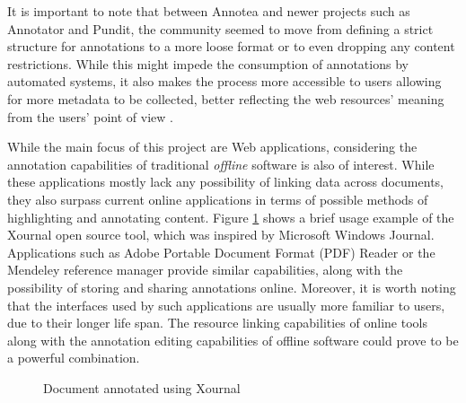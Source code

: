It is important to note that between Annotea and newer projects such as
Annotator and Pundit, the community seemed to move from defining a strict
structure for annotations to a more loose format or to even dropping any
content restrictions. While this might impede the consumption of annotations by
automated systems, it also makes the process more accessible to users allowing
for more metadata to be collected, better reflecting the web resources' meaning
from the users' point of view \cite{ref:wu}.

While the main focus of this project are Web applications, considering the
annotation capabilities of traditional \textit{offline} software is also of
interest. While these applications mostly lack any possibility of linking data
across documents, they also surpass current online applications in terms of
possible methods of highlighting and annotating content. Figure
\ref{fig:xournal} shows a brief usage example of the Xournal open source tool,
which was inspired by Microsoft Windows Journal. Applications such as Adobe
Portable Document Format (PDF) Reader \cite{ref:adobe} or the Mendeley
\cite{ref:mendeley} reference manager provide similar capabilities, along with
the possibility of storing and sharing annotations online. Moreover, it is
worth noting that the interfaces used by such applications are usually more
familiar to users, due to their longer life span. The resource linking
capabilities of online tools along with the annotation editing capabilities of
offline software could prove to be a powerful combination.

\begin{figure}[!ht]
  \centering
  \caption{Document annotated using Xournal}
  \label{fig:xournal}
\end{figure}
